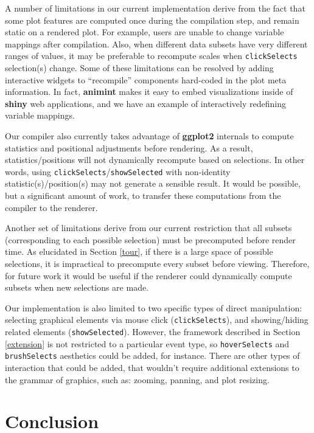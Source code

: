 \documentclass[12pt,]{article}
\theoremstyle{definition}
\theoremstyle{definition}
\theoremstyle{definition}
\theoremstyle{remark}
\begin{document}
A number of limitations in our current implementation derive from the
fact that some plot features are computed once during the compilation
step, and remain static on a rendered plot. For example, users are
unable to change variable mappings after compilation. Also, when
different data subsets have very different ranges of values, it may be
preferable to recompute scales when \texttt{clickSelects} selection(s)
change. Some of these limitations can be resolved by adding interactive
widgets to ``recompile'' components hard-coded in the plot meta
information. In fact, \textbf{animint} makes it easy to embed
visualizations inside of \textbf{shiny} web applications, and we have an
example of interactively redefining variable mappings.

Our compiler also currently takes advantage of \textbf{ggplot2}
internals to compute statistics and positional adjustments before
rendering. As a result, statistics/positions will not dynamically
recompute based on selections. In other words, using
\texttt{clickSelects}/\texttt{showSelected} with non-identity
statistic(s)/position(s) may not generate a sensible result. It would be
possible, but a significant amount of work, to transfer these
computations from the compiler to the renderer.

Another set of limitations derive from our current restriction that all
subsets (corresponding to each possible selection) must be precomputed
before render time. As elucidated in Section \ref{tour}, if there is a
large space of possible selections, it is impractical to precompute
every subset before viewing. Therefore, for future work it would be
useful if the renderer could dynamically compute subsets when new
selections are made.

Our implementation is also limited to two specific types of direct
manipulation: selecting graphical elements via mouse click
(\texttt{clickSelects}), and showing/hiding related elements
(\texttt{showSelected}). However, the framework described in Section
\ref{extension} is not restricted to a particular event type, so
\texttt{hoverSelects} and \texttt{brushSelects} aesthetics could be
added, for instance. There are other types of interaction that could be
added, that wouldn't require additional extensions to the grammar of
graphics, such as: zooming, panning, and plot resizing.

\hypertarget{conclusion}{%
\section{Conclusion}\label{conclusion}}
\end{document}

